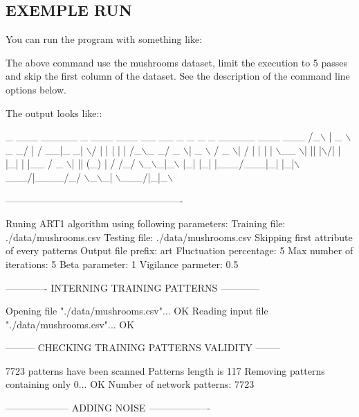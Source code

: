 \subsection*{E\-X\-E\-M\-P\-L\-E R\-U\-N }

You can run the program with something like\-: 
 The above command use the mushrooms dataset, limit the execution to 5 passes and skip the first column of the dataset. See the description of the command line options below.

The output looks like\-:\-: 
\begin{DoxyCode}
   \_   \_\_\_ \_\_\_\_\_ \_   \_\_\_ \_\_\_ \_\_  \_\_ \_   \_ \_      \_ \_\_\_\_\_ \_\_\_  \_\_\_ 
  /\_\(\backslash\) | \_ \(\backslash\)\_   \_/ | / \_\_|\_ \_|  \(\backslash\)/  | | | | |    /\_\(\backslash\)\_   \_/ \_ \(\backslash\)| \_ \(\backslash\)
 / \_ \(\backslash\)|   / | | | | \(\backslash\)\_\_ \(\backslash\)| || |\(\backslash\)/| | |\_| | |\_\_ / \_ \(\backslash\)| || (\_) |   /
/\_/ \(\backslash\)\_\(\backslash\)\_|\_\(\backslash\) |\_| |\_| |\_\_\_/\_\_\_|\_|  |\_|\(\backslash\)\_\_\_/|\_\_\_\_/\_/ \(\backslash\)\_\(\backslash\)\_| \(\backslash\)\_\_\_/|\_|\_\(\backslash\)

-------------------------------------------------------

Runing ART1 algorithm \textcolor{keyword}{using} following parameters:
    Training file: ./data/mushrooms.csv
    Testing file: ./data/mushrooms.csv
    Skipping first attribute of every patterns
    Output file prefix: art
    Fluctuation percentage: 5%
    Max number of iterations: 5
    Beta parameter: 1
    Vigilance parmeter: 0.5

------------- INTERNING TRAINING PATTERNS ------------

Opening file \textcolor{stringliteral}{"./data/mushrooms.csv"}... OK
Reading input file \textcolor{stringliteral}{"./data/mushrooms.csv"}... OK

--------- CHECKING TRAINING PATTERNS VALIDITY --------

7723 patterns have been scanned
Patterns length is 117
Removing patterns containing only 0... OK
Number of network patterns: 7723

-------------------- ADDING NOISE -------------------


\end{DoxyCode}

